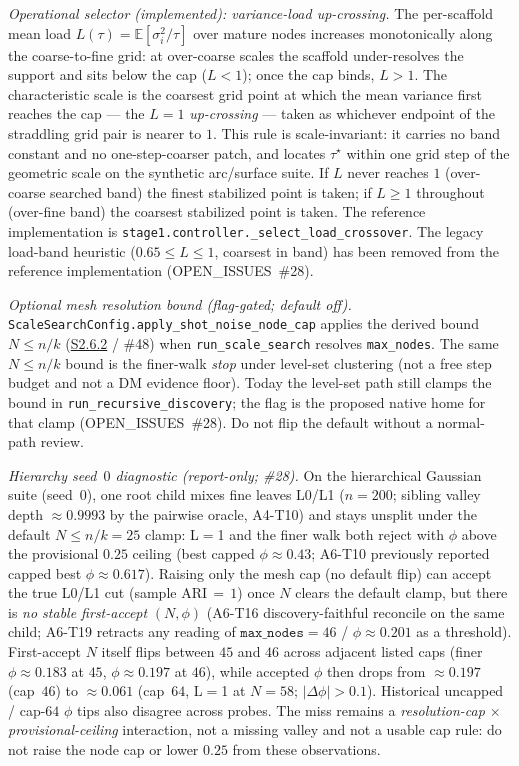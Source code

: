 \documentclass[11pt]{article}
\begin{document}
\emph{Operational selector (implemented): variance-load up-crossing.} The
per-scaffold mean load $L(\tau)=\mathbb E[\sigma_i^2/\tau]$ over mature nodes
increases monotonically along the coarse-to-fine grid: at over-coarse scales the
scaffold under-resolves the support and sits below the cap ($L<1$); once the cap
binds, $L>1$. The characteristic scale is the coarsest grid point at which the
mean variance first reaches the cap --- the $L=1$ \emph{up-crossing} --- taken as
whichever endpoint of the straddling grid pair is nearer to $1$. This rule is
scale-invariant: it carries no band constant and no one-step-coarser patch, and
locates $\tau^\star$ within one grid step of the geometric scale on the synthetic
arc/surface suite. If $L$ never reaches $1$ (over-coarse searched band) the finest
stabilized point is taken; if $L\ge 1$ throughout (over-fine band) the coarsest
stabilized point is taken. The reference implementation is
\texttt{stage1.controller.\_select\_load\_crossover}. The legacy load-band
heuristic ($0.65\le L\le1$, coarsest in band) has been removed from the
reference implementation (OPEN\_ISSUES~\#28).

\emph{Optional mesh resolution bound (flag-gated; default off).}
\texttt{ScaleSearchConfig.apply\_shot\_noise\_node\_cap} applies the derived
bound $N\le n/k$ (\hyperref[sec:si-level-set]{S2.6.2} / \#48) when
\texttt{run\_scale\_search} resolves \texttt{max\_nodes}.  The same $N\le n/k$
bound is the finer-walk \emph{stop} under level-set clustering (not a free step
budget and not a DM evidence floor).  Today the level-set path still clamps the
bound in \texttt{run\_recursive\_discovery}; the flag is the proposed native
home for that clamp (OPEN\_ISSUES~\#28).  Do not flip the default without a
normal-path review.

\emph{Hierarchy seed~$0$ diagnostic (report-only; \#28).}
On the hierarchical Gaussian suite (seed~$0$), one root child mixes fine leaves
L0/L1 ($n{=}200$; sibling valley depth $\approx0.9993$ by the pairwise oracle,
A4-T10) and stays unsplit under the default $N\le n/k{=}25$ clamp: L$=$1 and the
finer walk both reject with $\phi$ above the provisional $0.25$ ceiling (best
capped $\phi\approx0.43$; A6-T10 previously reported capped best $\phi\approx0.617$).
Raising only the mesh cap (no default flip) can accept the true L0/L1 cut
(sample ARI$\,{=}\,1$) once $N$ clears the default clamp, but there is
\emph{no stable first-accept} $(N,\phi)$ (A6-T16 discovery-faithful reconcile
on the same child; A6-T19 retracts any reading of
$\texttt{max\_nodes}{=}46$ / $\phi\approx0.201$ as a threshold).  First-accept
$N$ itself flips between $45$ and $46$ across adjacent listed caps (finer
$\phi\approx0.183$ at $45$, $\phi\approx0.197$ at $46$), while accepted $\phi$
then drops from $\approx0.197$ (cap~$46$) to $\approx0.061$ (cap~$64$, L$=$1 at
$N{=}58$; $\lvert\Delta\phi\rvert>0.1$).  Historical uncapped / cap-$64$ $\phi$
tips also disagree across probes.  The miss remains a
\emph{resolution-cap $\times$ provisional-ceiling} interaction, not a missing
valley and not a usable cap rule: do not raise the node cap or lower $0.25$
from these observations.
\end{document}
